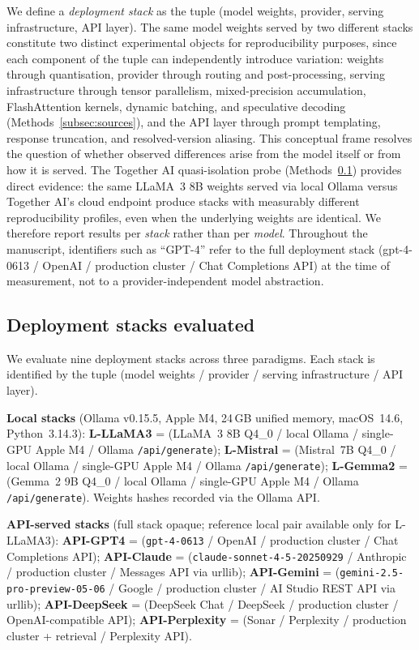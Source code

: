 \documentclass[sn-nature]{sn-jnl}
\begin{document}
We define a \emph{deployment stack} as the tuple (model weights, provider, serving infrastructure, API layer).
The same model weights served by two different stacks constitute two distinct experimental objects for reproducibility purposes, since each component of the tuple can independently introduce variation: weights through quantisation, provider through routing and post-processing, serving infrastructure through tensor parallelism, mixed-precision accumulation, FlashAttention kernels, dynamic batching, and speculative decoding (Methods~\ref{subsec:sources}), and the API layer through prompt templating, response truncation, and resolved-version aliasing.
This conceptual frame resolves the question of whether observed differences arise from the model itself or from how it is served.
The Together AI quasi-isolation probe (Methods~\ref{subsec:models}) provides direct evidence: the same LLaMA~3 8B weights served via local Ollama versus Together AI's cloud endpoint produce stacks with measurably different reproducibility profiles, even when the underlying weights are identical.
We therefore report results per \emph{stack} rather than per \emph{model}.
Throughout the manuscript, identifiers such as ``GPT-4'' refer to the full deployment stack (gpt-4-0613 / OpenAI / production cluster / Chat Completions API) at the time of measurement, not to a provider-independent model abstraction.


\subsection{Deployment stacks evaluated}\label{subsec:models}

We evaluate nine deployment stacks across three paradigms.
Each stack is identified by the tuple (model weights / provider / serving infrastructure / API layer).

\textbf{Local stacks} (Ollama v0.15.5, Apple M4, 24\,GB unified memory, macOS~14.6, Python~3.14.3):
\textbf{L-LLaMA3} = (LLaMA~3 8B Q4\_0\cite{grattafiori2024llama3} / local Ollama / single-GPU Apple M4 / Ollama \texttt{/api/generate});
\textbf{L-Mistral} = (Mistral~7B Q4\_0\cite{jiang2023mistral} / local Ollama / single-GPU Apple M4 / Ollama \texttt{/api/generate});
\textbf{L-Gemma2} = (Gemma~2 9B Q4\_0\cite{team2024gemma} / local Ollama / single-GPU Apple M4 / Ollama \texttt{/api/generate}).
Weights hashes recorded via the Ollama API.

\textbf{API-served stacks} (full stack opaque; reference local pair available only for L-LLaMA3):
\textbf{API-GPT4} = (\texttt{gpt-4-0613}\cite{achiam2023gpt4} / OpenAI / production cluster / Chat Completions API);
\textbf{API-Claude} = (\texttt{claude-sonnet-4-5-20250929}\cite{anthropic2024claude} / Anthropic / production cluster / Messages API via urllib);
\textbf{API-Gemini} = (\texttt{gemini-2.5-pro-preview-05-06}\cite{reid2024gemini15} / Google / production cluster / AI Studio REST API via urllib);
\textbf{API-DeepSeek} = (DeepSeek Chat / DeepSeek / production cluster / OpenAI-compatible API);
\textbf{API-Perplexity} = (Sonar / Perplexity / production cluster + retrieval / Perplexity API).
\end{document}
